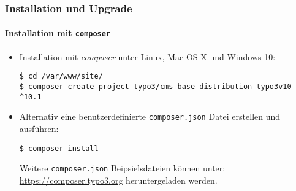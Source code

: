 
\begin{frame}[fragile]
	\frametitle{Installation und Upgrade}
	\framesubtitle{Installation mit \texttt{composer}}

	\begin{itemize}
		\item Installation mit \textit{composer} unter Linux, Mac OS X und Windows 10:

			\begin{lstlisting}
$ cd /var/www/site/
$ composer create-project typo3/cms-base-distribution typo3v10 ^10.1
			\end{lstlisting}

		\item Alternativ eine benutzerdefinierte \texttt{composer.json} Datei erstellen und ausführen:

			\begin{lstlisting}
$ composer install
			\end{lstlisting}

			Weitere \texttt{composer.json} Beipsielsdateien können unter:\newline
			\smaller
				\href{https://composer.typo3.org}{https://composer.typo3.org} heruntergeladen werden.
			\normalsize

	\end{itemize}
\end{frame}

